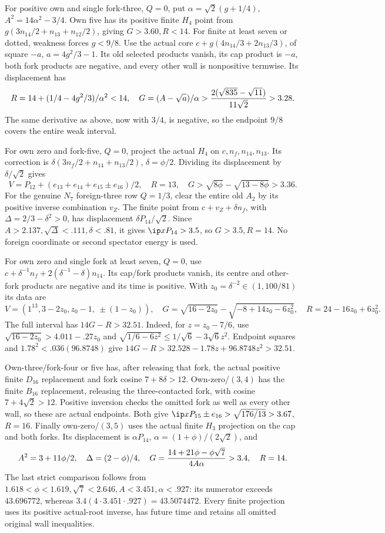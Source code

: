 For positive own and single fork-three, \(Q=0\), put
\(\alpha=\sqrt2(g+1/4)\), \(A^2=14\alpha^2-3/4\).
Own five has its positive finite \(H_4\) point from
\(g(3n_{14}/2+n_{13}+n_{12}/2)\), giving \(G>3.60,R<14\).
For finite at least seven or dotted, weakness forces \(g<9/8\).
Use the actual core \(c+g(4n_{14}/3+2n_{13}/3)\), of square
\(-a\), \(a=4g^2/3-1\). Its old selected products vanish,
its cap product is \(-a\), both fork products are negative,
and every other wall is nonpositive termwise. Its displacement
has
\[
 R=14+(1/4-4g^2/3)/\alpha^2<14,\quad
 G=(A-\sqrt a)/\alpha>
 {2(\sqrt{835}-\sqrt{11})\over11\sqrt2}>3.28.
\]
The same derivative as above, now with \(3/4\), is negative,
so the endpoint \(9/8\) covers the entire weak interval.

For own zero and fork-five, \(Q=0\), project the actual \(H_4\)
on \(c,n_f,n_{14},n_{13}\). Its correction is
\(\delta(3n_f/2+n_{14}+n_{13}/2)\), \(\delta=\phi/2\).
Dividing its displacement by \(\delta/\sqrt2\) gives
\[
 V=P_{12}+(e_{13}+e_{14}+e_{15}\pm e_{16})/2,\quad
 R=13,\quad G>\sqrt{8\phi}-\sqrt{13-8\phi}>3.36.
\]
For the genuine \(N_7\) foreign-three row \(Q=1/3\), clear
the entire old \(A_2\) by its positive inverse combination \(v_Z\).
The finite point from \(c+v_Z+\delta n_f\), with
\(\Delta=2/3-\delta^2>0\), has displacement
\(\delta P_{14}/\sqrt2\). Since
\(A>2.137,\sqrt\Delta<.111,\delta<.81\), it gives
\(\ip x{P_{14}}>3.5\), so \(G>3.5,R=14\).
No foreign coordinate or second spectator energy is used.

For own zero and single fork at least seven, \(Q=0\), use
\(c+\delta^{-1}n_f+2(\delta^{-1}-\delta)n_{14}\).
Its cap/fork products vanish, its centre and other-fork products
are negative and its time is positive. With
\(z_0=\delta^{-2}\in(1,100/81)\) its data are
\[
 V=(1^{13},3-2z_0,z_0-1,\ \pm(1-z_0)),\quad
 G=\sqrt{16-2z_0}-\sqrt{-8+14z_0-6z_0^2},\quad
 R=24-16z_0+6z_0^2.
\]
The full interval has \(14G-R>32.51\). Indeed, for
\(z=z_0-7/6\), use
\(\sqrt{16-2z_0}>4.011-.27z_0\) and
\(\sqrt{1/6-6z^2}\le1/\sqrt6-3\sqrt6z^2\).
Endpoint squares and \(1.78^2<.036(96.8748)\) give
\(14G-R>32.528-1.78z+96.8748z^2>32.51\).

Own-three/fork-four or five has, after releasing that fork,
the actual positive finite \(D_{16}\) replacement and fork
cosine \(7+8\delta>12\). Own-zero/\((3,4)\) has the finite
\(B_{16}\) replacement, releasing the three-contacted fork,
with cosine \(7+4\sqrt2>12\). Positive inversion checks the
omitted fork as well as every other wall, so these are actual
endpoints. Both give
\(\ip x{P_{15}\pm e_{16}}>\sqrt{176/13}>3.67\), \(R=16\).
Finally own-zero/\((3,5)\) uses the actual finite \(H_3\)
projection on the cap and both forks. Its displacement is
\(\alpha P_{14}\), \(\alpha=(1+\phi)/(2\sqrt2)\), and
\[
 A^2=3+11\phi/2,\quad \Delta=(2-\phi)/4,\quad
 G={14+21\phi-\phi\sqrt7\over4A\alpha}>3.4,\quad R=14.
\]
The last strict comparison follows from
\(1.618<\phi<1.619,\sqrt7<2.646,A<3.451,\alpha<.927\):
its numerator exceeds \(43.696772\), whereas
\(3.4(4\cdot3.451\cdot.927)=43.5074472\).
Every finite projection uses its positive actual-root inverse,
has future time and retains all omitted original wall inequalities.

